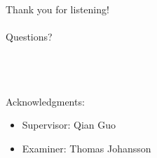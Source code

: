 \documentclass[aspectratio=169]{beamer}
\begin{document}
\begin{frame}%
\begin{center}
\Huge Thank you for listening! \\~\\
\Large Questions?
\end{center}
\\~\\~\\ \small Acknowledgments:
\begin{itemize}
\begin{itemize}
    \item Supervisor: Qian Guo
    \item Examiner: Thomas Johansson
\end{itemize}
\end{itemize}
\end{frame}
\end{document}
